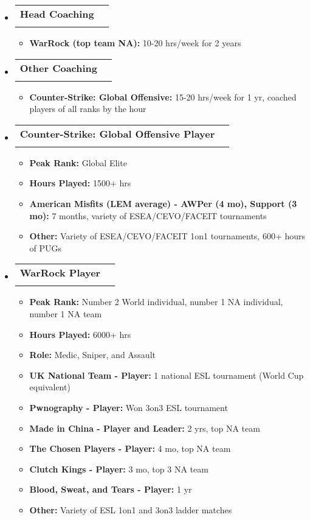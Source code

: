 \documentclass[letterpaper,11pt]{article}
\makeatletter
\newcommand{\resitem}[1]{\item #1 \vspace{-2pt}}
\newcommand{\ressubheading}[4]{
\begin{tabular*}{6.5in}{l@{\cftdotfill{\cftsecdotsep}\extracolsep{\fill}}r}
		\textbf{#1} & #2 \\
		\textit{#3} & \textit{#4} \\
\end{tabular*}\vspace{-6pt}}
\makeatother
\begin{document}
\begin{itemize}

\item[]

\ressubheading{Head Coaching}{}{}{}

\begin{itemize}
  \resitem{\textbf{WarRock (top team NA):} 10-20 hrs/week for 2 years}
\end{itemize}

\item[]

\ressubheading{Other Coaching}{}{}{}

\begin{itemize}
  \resitem{\textbf{Counter-Strike: Global Offensive:} 15-20 hrs/week for 1 yr, coached players of all ranks by the hour}
\end{itemize}

\item[]

\ressubheading{Counter-Strike: Global Offensive Player}{}{}{}

\begin{itemize}
  \resitem{\textbf{Peak Rank:} Global Elite}
  \resitem{\textbf{Hours Played:} 1500+ hrs}
  \resitem{\textbf{American Misfits (LEM average) - AWPer (4 mo), Support (3 mo):} 7 months, variety of ESEA/CEVO/FACEIT tournaments}
  \resitem{\textbf{Other:} Variety of ESEA/CEVO/FACEIT 1on1 tournaments, 600+ hours of PUGs}
\end{itemize}

\item[]

\ressubheading{WarRock Player}{}{}{}

\begin{itemize}
  \resitem{\textbf{Peak Rank:} Number 2 World individual, number 1 NA individual, number 1 NA team}
  \resitem{\textbf{Hours Played:} 6000+ hrs}
  \resitem{\textbf{Role:} Medic, Sniper, and Assault}
  \resitem{\textbf{UK National Team - Player:} 1 national ESL tournament (World Cup equivalent)}
  \resitem{\textbf{Pwnography - Player:} Won 3on3 ESL tournament}
  \resitem{\textbf{Made in China - Player and Leader:} 2 yrs, top NA team}
  \resitem{\textbf{The Chosen Players - Player:} 4 mo, top NA team}
  \resitem{\textbf{Clutch Kings - Player:} 3 mo, top 3 NA team}
  \resitem{\textbf{Blood, Sweat, and Tears - Player:} 1 yr}
  \resitem{\textbf{Other:} Variety of ESL 1on1 and 3on3 ladder matches}
\end{itemize}

\end{itemize}
\end{document}
